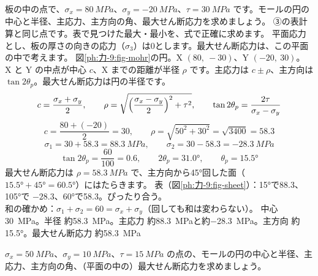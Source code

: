 \begin{phreidai}[モールの円をかいて主応力を求める]
\label{ph:力-9:ex3}板の中の点で、$\sigma_x=\qty{80}{MPa}$、$\sigma_y=\qty{-20}{MPa}$、$\tau=\qty{30}{MPa}$ です。モールの円の中心と半径、主応力、主方向の角、最大せん断応力を求めましょう。
\phbamen
③の表計算と同じ点です。表で見つけた最大・最小を、式で正確に求めます。
\phmushi
平面応力とし、板の厚さの向きの応力（$\sigma_3$）は0とします。最大せん断応力は、この平面の中で考えます。
\phzu
図\ref{ph:力-9:fig-mohr}の円。X $(80,\ -30)$、Y $(-20,\ 30)$。
\phriyu
X と Y の中点が中心 $c$、X までの距離が半径 $\rho$ です。主応力は $c\pm\rho$、主方向は $\tan2\theta_p$。最大せん断応力は円の半径です。
\phtateru
\[c=\frac{\sigma_x+\sigma_y}{2},\qquad \rho=\sqrt{\Bigl(\frac{\sigma_x-\sigma_y}{2}\Bigr)^2+\tau^2},\qquad\tan2\theta_p=\frac{2\tau}{\sigma_x-\sigma_y}\]
\phtoku
\[c=\frac{80+(-20)}{2}=30,\qquad \rho=\sqrt{50^2+30^2}=\sqrt{3400}=58.3\]
\[\sigma_1=30+58.3=\qty{88.3}{MPa},\qquad\sigma_2=30-58.3=\qty{-28.3}{MPa}\]
\[\tan2\theta_p=\frac{60}{100}=0.6,\qquad2\theta_p=31.0°,\qquad\theta_p=15.5°\]
最大せん断応力は $\rho=\qty{58.3}{MPa}$ で、主方向から45°回した面（$15.5°+45°=60.5°$）にはたらきます。
\phtashikame
表（図\ref{ph:力-9:fig-sheet}）：15°で88.3、105°で $-28.3$、60°で58.3。ぴったり合う。\\
和の確かめ：$\sigma_1+\sigma_2=60=\sigma_x+\sigma_y$（回しても和は変わらない）。
\kotae 中心\qty{30}{MPa}。半径 約\qty{58.3}{MPa}。主応力 約\qty{88.3}{MPa}と約\qty{-28.3}{MPa}。主方向 約15.5°。最大せん断応力 約\qty{58.3}{MPa}
\end{phreidai}
\begin{jibun}
$\sigma_x=\qty{50}{MPa}$、$\sigma_y=\qty{10}{MPa}$、$\tau=\qty{15}{MPa}$ の点の、モールの円の中心と半径、主応力、主方向の角、（平面の中の）最大せん断応力を求めましょう。
\end{jibun}

